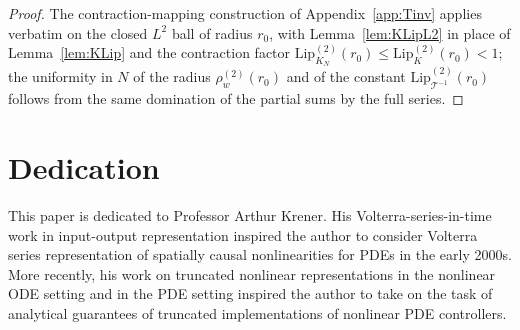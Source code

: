 \documentclass[amsthm]{autart}
\theoremstyle{plain}
\theoremstyle{definition}
\newcommand{\Tcal}{\mathcal{T}}
\newcommand{\Ltwo}{L^2}
\newcommand{\Lipk}{\mathrm{Lip}_K}
\newcommand{\LipKn}{\mathrm{Lip}_{K_N}}
\newcommand{\LipT}{\mathrm{Lip}_{\Tcal^{-1}}}
\begin{document}
\begin{proof}
The contraction-mapping construction of Appendix~\ref{app:Tinv} applies verbatim on the closed $\Ltwo$ ball of radius $r_0$, with Lemma~\ref{lem:KLipL2} in place of Lemma~\ref{lem:KLip} and the contraction factor $\LipKn^{(2)}(r_0) \le \Lipk^{(2)}(r_0) < 1$; the uniformity in $N$ of the radius $\rho_w^{(2)}(r_0)$ and of the constant $\LipT^{(2)}(r_0)$ follows from the same domination of the partial sums by the full series.
\end{proof}

\section*{Dedication}

This paper is dedicated to Professor Arthur Krener. His Volterra-series-in-time work \cite{1101898} in input-output representation inspired the author to consider Volterra series representation of spatially causal nonlinearities for PDEs in the early 2000s. More recently, his work on truncated nonlinear representations in the nonlinear ODE setting \cite{Krener1984ApproximateLinearization} and in the PDE setting \cite{9580683} inspired the author to take on the task of analytical guarantees of truncated implementations of nonlinear PDE controllers.  




\end{document}

